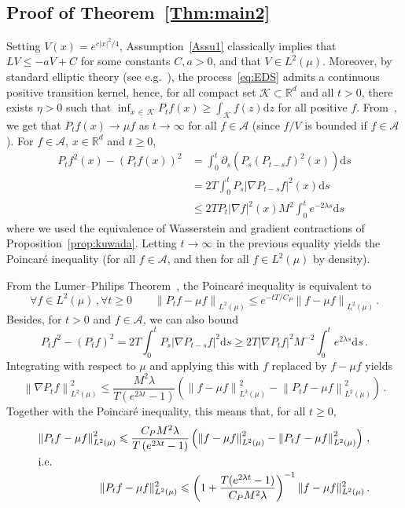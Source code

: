\documentclass[AHL,Unicode,longabstracts,published]{cedram}
\newcommand{\R}{\mathbb R}
\newcommand{\A}{\mathcal A}
\newcommand{\clK}{\mathcal K}
\newcommand{\dd}{\mathrm{d}}
\newcommand{\na}{\nabla}
\newcommand{\1}{\mathbbm{1}}
\newcommand{\nv}[1]{#1}
\let\oldforall\forall
\renewcommand*{\forall}{\mathrel{\oldforall}}
\newcommand{\R}{\mathbb R}
\begin{document}
\subsection{Proof of Theorem~\ref{Thm:main2}}\label{sec:preuveL2}
Setting $V(x) = e^{c|x|^2/4}$, Assumption~\ref{Assu1} classically implies that $LV\leqslant -aV + C$ for some constants $C,a>0$, and that $V\in L^2 (\mu)$. Moreover, by standard elliptic theory (see e.g.~\cite[Theorem~0.5 and Condition 0.24.A1]{DynkinVol2}), the process~\eqref{eq:EDS} admits a continuous positive transition kernel, hence, for all compact set $\clK\subset \R^d$ and all $t>0$, there exists $\eta>0$ such that $\inf_{x\,\in\,\clK} P_t f(x) \geqslant \int_{\clK} f(z)\dd z$ for all positive $f$. From~\cite{HairerMattingly2008}, we get that $P_t f(x) \rightarrow \mu f$ as $t\rightarrow \infty$ for all $f\in \A$ (since $f/V$ is bounded if $f\in\A$). For $f\in\A$, $x\in\R^d$ and $t\geqslant0$,
\begin{align*}
P_t f^2(x) - (P_t f(x))^2 & = \int_0^t \partial_s \left( P_s\left(P_{t-s} f\right)^2(x)\right) \dd s\\
& = 2 T \int_0^t P_s\left|\na P_{t-s} f\right|^2 (x)\dd s \\
& \leqslant 2T P_t|\na f|^2 (x) M^2 \int_0^t e^{-2\lambda s} \dd s
\end{align*}
where we used the equivalence of Wasserstein and gradient contractions \nv{of Proposition~\ref{prop:kuwada}}. Letting $t\rightarrow \infty$ in the previous equality yields the Poincaré inequality (for all $f\in\A$, and then for all $f\in L^2(\mu)$ by density).


From the Lumer--Philips Theorem~\cite[Chapter~IX, p.~250]{Yosida}, the Poincaré inequality is equivalent to
\[
\forall f\in L^2(\mu)\,, \forall t\geqslant 0\qquad \left\|P_tf -\mu f\right\|_{L^2(\mu)} \leqslant e^{-tT/C_P}\left\|f -\mu f\right\|_{L^2(\mu)} \,.
\]
Besides, for $t>0$ and $f\in\A$, we can also bound
\[
P_t f^2 - (P_t f)^2 = 2 T \int_0^t P_s\left|\na P_{t-s} f\right|^2 \dd s \geqslant 2 T \left|\na P_{t} f\right|^2 M^{-2}\int_0^t e^{2\lambda s} \dd s\,.
\]
Integrating with respect to $\mu$ and applying this with $f$ replaced by $f-\mu f$ yields
\[
\left\|\na P_t f\right\|_{L^2(\mu)}^2 \leqslant \frac{M^2\lambda}{T\left(e^{2\lambda t}-1\right)} \left( \left\|f-\mu f\right\|_{L^2(\mu)}^2- \left\|P_t f-\mu f\right\|_{L^2(\mu)}^2\right) \,.
\]
Together with the Poincaré inequality, this means that, for all $t\geqslant 0$,
\begin{align*}
\left\|P_t f - \mu f\right\|_{L^2(\mu)}^2 \leqslant \frac{C_PM^2\lambda}{T\left(e^{2\lambda t}-1\right)} \left( \left\|f-\mu f\right\|_{L^2(\mu)}^2- \left\|P_t f-\mu f\right\|_{L^2(\mu)}^2\right)\,,
\\
\intertext{i.e.}
\|P_t f - \mu f\|_{L^2(\mu)}^2 \leqslant \left( 1+ \nv{\frac{T(e^{2\lambda t}-1)}{C_PM^2\lambda }}\right)^{-1}\|f-\mu f\|_{L^2(\mu)}^2\,.
\end{align*}
\end{document}
